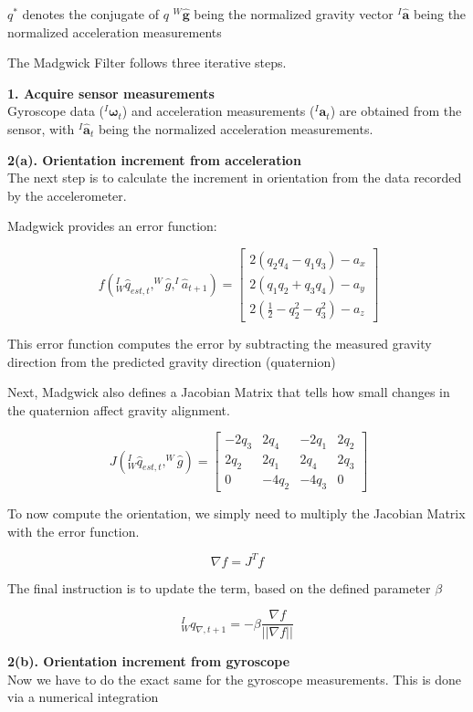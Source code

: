 $q^*$ denotes the conjugate of $q$
$^W\mathbf{\hat{g}}$ being the normalized gravity vector
$^I\mathbf{\hat{a}}$ being the normalized acceleration measurements

The Madgwick Filter follows three iterative steps.

{\large \textbf{1. Acquire sensor measurements}}\\[0.5em]
Gyroscope data ($^I\mathbf{\omega}_t$) and acceleration measurements ($^I\mathbf{a}_t$) are obtained from the sensor, with $^I\mathbf{\hat{a}}_t$ being the normalized acceleration measurements.

{\large \textbf{2(a). Orientation increment from acceleration}}\\[0.5em]
The next step is to calculate the increment in orientation from the data recorded by the accelerometer.

Madgwick provides an error function:

\[
\ f(^I_W\hat{q}_{est,t}, ^W\hat{g}, ^I\hat{a}_{t+1}) = \begin{bmatrix}
    2 (q_2q_4 - q_1q_3) -a_x \\
    2(q_1q_2 + q_3q_4) - a_y \\
    2 (\frac{1}{2} - q^2_2 - q^2_3) - a_z
\end{bmatrix}
\]

This error function computes the error by subtracting the measured gravity direction from the predicted gravity direction (quaternion)

Next, Madgwick also defines a Jacobian Matrix that tells how small changes in the quaternion affect gravity alignment.

\[
\ J(^I_W\hat{q}_{est,t}, ^W\hat{g}) = \begin{bmatrix}
    -2q_3 & 2q_4 & -2q_1 & 2q_2 \\
    2q_2  & 2q_1 & 2q_4 & 2q_3 \\
    0 & -4q_2 & -4q_3 & 0
\end{bmatrix}
\]

To now compute the orientation, we simply need to multiply the Jacobian Matrix with the error function.

\[
\nabla f = J^T f
\]

The final instruction is to update the term, based on the defined parameter $\beta$

\[
^I_W q_{\nabla, t+1} = -\beta\frac{\nabla f}{||\nabla f||}
\]

{\large \textbf{2(b). Orientation increment from gyroscope}}\\[0.5em]
Now we have to do the exact same for the gyroscope measurements. This is done via a numerical integration

